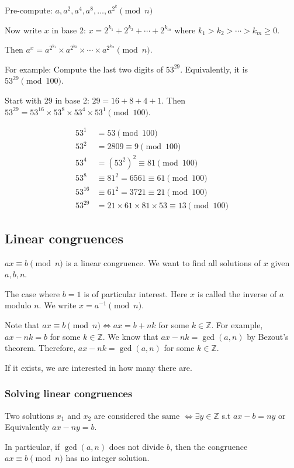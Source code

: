 \documentclass[letterpaper,12pt,oneside]{article}
\begin{document}
Pre-compute: $a,a^2,a^4,a^8,\ldots,a^{2^k} \pmod n$

Now write $x$ in base 2: $x=2^{k_1}+2^{k_2}+\cdots+2^{k_m}$ where
$k_1>k_2>\cdots>k_m\ge 0$.

Then $a^x=a^{2^{k_1}}\times a^{2^{k_2}}\times \cdots \times a^{2^{k_m}} \pmod
    n$.

For example: Compute the last two digits of $53^{29}$. Equivalently, it is
$53^{29} \pmod {100}$.

Start with 29 in base 2: $29=16+8+4+1$. Then $53^{29}=53^{16}\times 53^8\times
    53^4\times 53^1 \pmod {100}$.

\begin{align*}
    53^1    & = 53 \pmod {100}                                      \\
    53^2    & = 2809 \equiv 9 \pmod {100}                           \\
    53^4    & = (53^2)^2 \equiv 81 \pmod {100}                      \\
    53^8    & \equiv 81^2 = 6561 \equiv 61 \pmod {100}              \\
    53^{16} & \equiv 61^2 = 3721 \equiv 21 \pmod {100}              \\
    53^{29} & = 21\times 61\times 81\times 53 \equiv 13 \pmod {100}
\end{align*}
\subsection{Linear congruences}
$ax\equiv b \pmod n$ is a linear congruence. We want to find all solutions of $x$ given $a,b,n$.

The case where $b=1$ is of particular interest. Here $x$ is called the inverse
of $a$ modulo $n$. We write $x=a^{-1} \pmod n$.

Note that $ax \equiv b \pmod n \iff a x = b + n k$ for some $k \in \mathbb{Z}$.
For example, $ax-nk=b$ for some $k\in \mathbb{Z}$. We know that
$ax-nk=\gcd(a,n)$ by Bezout's theorem. Therefore, $ax-nk=\gcd(a,n)$ for some
$k\in \mathbb{Z}$.

If it exists, we are interested in how many there are.
\subsubsection{Solving linear congruences}
Two solutions $x_1$ and $x_2$ are considered the same $\iff \exists y \in
    \mathbb{Z}$ s.t $ax-b=ny$ or Equivalently $ax-ny=b$.

In particular, if $\gcd(a,n)$ does not divide $b$, then the congruence
$ax\equiv b \pmod n$ has no integer solution.
\end{document}
